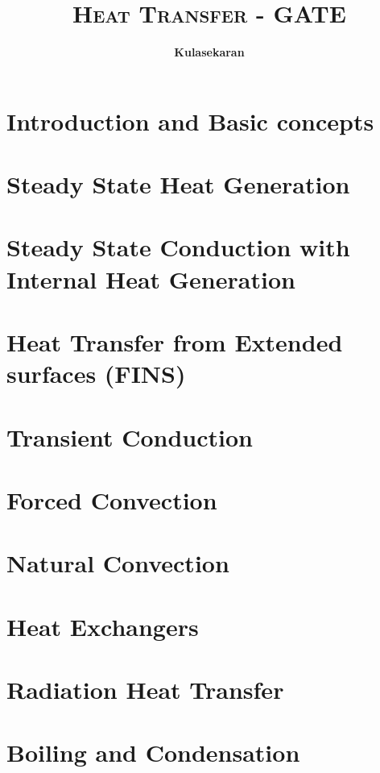 \documentclass[8pt]{report}
\title{\Huge{\textsc{Heat Transfer - GATE}}}
\author{\huge{\textbf{Kulasekaran}}}
\begin{document}
\maketitle
\tableofcontents
\chapter{Introduction and Basic concepts}
\chapter{Steady State Heat Generation}
\chapter{Steady State Conduction with Internal Heat Generation}
\chapter{Heat Transfer from Extended surfaces (FINS)}
\chapter{Transient Conduction}
\chapter{Forced Convection}
\chapter{Natural Convection}
\chapter{Heat Exchangers}
\chapter{Radiation Heat Transfer}
\chapter{Boiling and Condensation}
\end{document}
